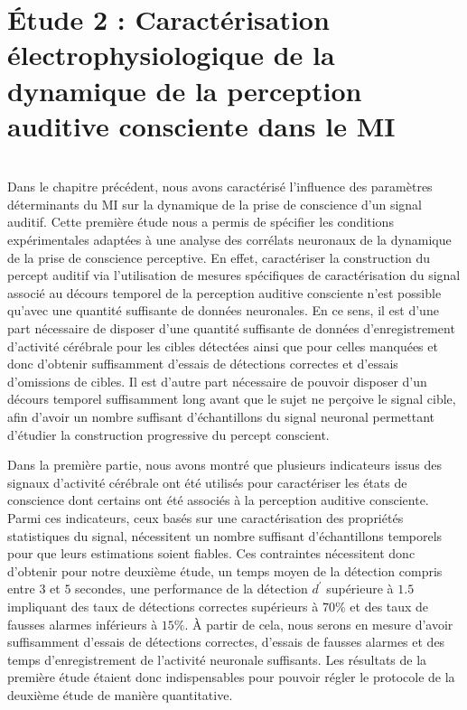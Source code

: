 \chapter[Étude 2 : Caractérisation électrophysiologique de la perception consciente dans le MI]{Étude 2 : Caractérisation électrophysiologique de la dynamique de la perception auditive consciente dans le MI}
\label{chapitre5}
\noindent \hrulefill \\

Dans le chapitre précédent, nous avons caractérisé l'influence des paramètres déterminants du MI sur la dynamique de la prise de conscience d'un signal auditif. 
Cette première étude nous a permis de spécifier les conditions expérimentales adaptées à une analyse des corrélats neuronaux de la dynamique de la prise de conscience perceptive. 
En effet, caractériser la construction du percept auditif via l'utilisation de mesures spécifiques de caractérisation du signal associé au décours temporel de la perception auditive consciente n'est possible qu'avec une quantité suffisante de données neuronales. 
En ce sens, il est d'une part nécessaire de disposer d'une quantité suffisante de données d'enregistrement d'activité cérébrale pour les cibles détectées ainsi que pour celles manquées et donc d'obtenir suffisamment d'essais de détections correctes et d'essais d'omissions de cibles. 
Il est d'autre part nécessaire de pouvoir disposer d'un décours temporel suffisamment long avant que le sujet ne perçoive le signal cible, afin d'avoir un nombre suffisant d'échantillons du signal neuronal permettant d'étudier la construction progressive du percept conscient. 

Dans la première partie, nous avons montré que plusieurs indicateurs issus des signaux d'activité cérébrale ont été utilisés pour caractériser les états de conscience dont certains ont été associés à la perception auditive consciente. 
Parmi ces indicateurs, ceux basés sur une caractérisation des propriétés statistiques du signal, nécessitent un nombre suffisant d'échantillons temporels pour que leurs estimations soient fiables. 
Ces contraintes nécessitent donc d'obtenir pour notre deuxième étude, un temps moyen de la détection compris entre $3$ et $5$ secondes, une performance de la détection $d^\prime$ supérieure à $1.5$ impliquant des taux de détections correctes supérieurs à $70\%$ et des taux de fausses alarmes inférieurs à $15\%$. 
À partir de cela, nous serons en mesure d'avoir suffisamment d'essais de détections correctes, d'essais de fausses alarmes et des temps d'enregistrement de l'activité neuronale suffisants. 
Les résultats de la première étude étaient donc indispensables pour pouvoir régler le protocole de la deuxième étude de manière quantitative. 

